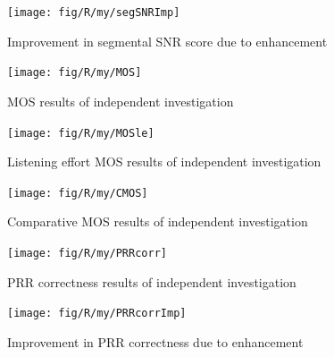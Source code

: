 \begin{figure}[h]
\noindent \begin{centering}
\texttt{[image: fig/R/my/segSNRImp]}
\par\end{centering}

\protect\caption{\label{fig:my-segSNR-imp}Improvement in segmental \acs{SNR} score
due to enhancement}
\end{figure}


\begin{figure}[h]
\noindent \begin{centering}
\texttt{[image: fig/R/my/MOS]}
\par\end{centering}

\protect\caption{\label{fig:my-MOS}\acs{MOS} results of independent investigation}
\end{figure}


\begin{figure}[h]
\noindent \begin{centering}
\texttt{[image: fig/R/my/MOSle]}
\par\end{centering}

\protect\caption{\label{fig:my-MOSle}Listening effort \acs{MOS} results of independent
investigation}
\end{figure}


\begin{figure}[h]
\noindent \begin{centering}
\texttt{[image: fig/R/my/CMOS]}
\par\end{centering}

\protect\caption{\label{fig:my-CMOS}Comparative \acs{MOS} results of independent
investigation}
\end{figure}


\begin{figure}[h]
\noindent \begin{centering}
\texttt{[image: fig/R/my/PRRcorr]}
\par\end{centering}

\protect\caption{\label{fig:my-PRRcorr}\acs{PRR} correctness results of independent
investigation}
\end{figure}


\begin{figure}[h]
\noindent \begin{centering}
\texttt{[image: fig/R/my/PRRcorrImp]}
\par\end{centering}

\protect\caption{\label{fig:my-PRRcorr-imp}Improvement in \acs{PRR} correctness due
to enhancement}
\end{figure}


